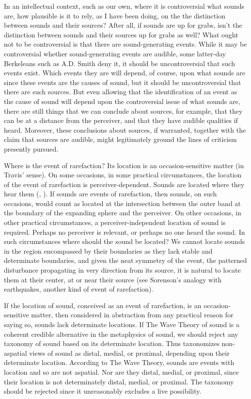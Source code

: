 \documentclass[12pt]{article}
\begin{document}
In an intellectual context, such as our own, where it is controversial what sounds are, how plausible is it to rely, as I have been doing, on the the distinction between sounds and their sources? After all, if sounds are up for grabs, isn’t the distinction between sounds and their sources up for grabs as well? What ought not to be controversial is that there are sound-generating events. While it may be controversial whether sound-generating events are audible, some latter-day Berkeleans such as A.D. Smith \citeyearpar{Smith:2002sa} deny it, it should be uncontroversial that such events exist. Which events they are will depend, of course, upon what sounds are since these events are the causes of sound, but it should be uncontroversial that there are such sources. But even allowing that the identification of an event as the cause of sound will depend upon the controversial issue of what sounds are, there are still things that we can conclude about sources, for example, that they can be at a distance from the perceiver, and that they have audible qualities if heard. Moreover, these conclusions about sources, if warranted, together with the claim that sources are audible, might legitimately ground the lines of criticism presently pursued. 

Where is the event of rarefaction? Its location is an occasion-sensitive matter (in Travis' \citeyear{Travis:2008la} sense). On some occasions, in some practical circumstances, the location of the event of rarefaction is perceiver-dependent. Sounds are located where they hear them (\citealt{Nudds:2009sf}, \citealt{OShaughnessy:2009aa}). If sounds are events of rarefaction, then sounds, on such occasions, would count as located at the intersection between the outer band at the boundary of the expanding sphere and the perceiver. On other occasions, in other practical circumstances, a perceiver-independent location of sound is required. Perhaps no perceiver is relevant, or perhaps no one heard the sound. In such circumstances where should the sound be located? We cannot locate sounds in the region encompassed by their boundaries as they lack stable and determinate boundaries, and given the neat symmetry of the event, the patterned disturbance propagating in very direction from its source, it is natural to locate them at their center, at or near their source (see Sorenson's \citeyear{Sorensen:2009aa} analogy with earthquakes, another kind of event of rarefaction).

If the location of sound, conceived as an event of rarefaction, is an occasion-sensitive matter, then considered in abstraction from any practical reason for saying so, sounds lack determinate locations. If The Wave Theory of sound is a coherent credible alternative in the metaphysics of sound, we should reject any taxonomy of sound based on its determinate location. Thus \citet{Casati:2014hw} taxonomizes non-aspatial views of sound as distal, medial, or proximal, depending upon their determinate location. According to The Wave Theory, sounds are events with location and so are not aspatial. Nor are they distal, medial, or proximal, since their location is not determinately distal, medial, or proximal. The taxonomy should be rejected since it unreasonably excludes a live possibility.
\end{document}
